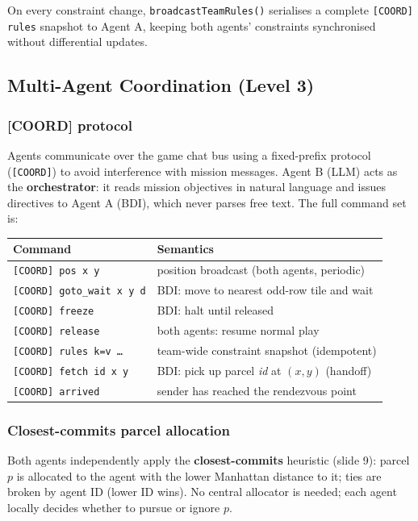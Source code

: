 \documentclass[10pt,a4paper,twocolumn]{article}
\begin{document}
On every constraint change, \texttt{broadcastTeamRules()} serialises a complete
\texttt{[COORD] rules} snapshot to Agent A, keeping both agents' constraints
synchronised without differential updates.

\subsection{Multi-Agent Coordination (Level 3)}

\subsubsection*{[COORD] protocol}
Agents communicate over the game chat bus using a fixed-prefix protocol
(\texttt{[COORD]}) to avoid interference with mission messages.  Agent B
(LLM) acts as the \textbf{orchestrator}: it reads mission objectives in natural
language and issues directives to Agent A (BDI), which never parses free text.
The full command set is:

\begin{center}
\footnotesize
\begin{tabularx}{\columnwidth}{@{} l X @{}}
\toprule
\textbf{Command} & \textbf{Semantics} \\
\midrule
\texttt{[COORD] pos x y}          & position broadcast (both agents, periodic) \\
\texttt{[COORD] goto\_wait x y d} & BDI: move to nearest odd-row tile and wait \\
\texttt{[COORD] freeze}           & BDI: halt until released \\
\texttt{[COORD] release}          & both agents: resume normal play \\
\texttt{[COORD] rules k=v \ldots} & team-wide constraint snapshot (idempotent) \\
\texttt{[COORD] fetch id x y}     & BDI: pick up parcel \textit{id} at $(x,y)$ (handoff) \\
\texttt{[COORD] arrived}          & sender has reached the rendezvous point \\
\bottomrule
\end{tabularx}
\end{center}

\subsubsection*{Closest-commits parcel allocation}
Both agents independently apply the \textbf{closest-commits} heuristic (slide 9):
parcel $p$ is allocated to the agent with the lower Manhattan distance to it;
ties are broken by agent ID (lower ID wins).  No central allocator is needed;
each agent locally decides whether to pursue or ignore $p$.
\end{document}
